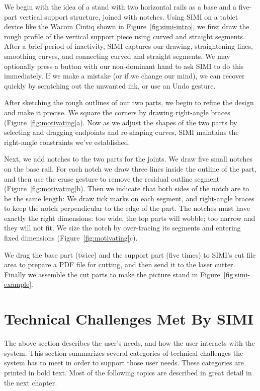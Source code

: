 We begin with the idea of a stand with two horizontal rails as a base
and a five-part vertical support structure, joined with notches. Using
SIMI on a tablet device like the Wacom Cintiq shown in
Figure~\ref{fig:simi-intro}, we first draw the rough profile of the
vertical support piece using curved and straight segments. After a
brief period of inactivity, SIMI captures our drawing, straightening
lines, smoothing curves, and connecting curved and straight
segments. We may optionally press a button with our non-dominant hand
to ask SIMI to do this immediately. If we make a mistake (or if we
change our mind), we can recover quickly by scratching out the
unwanted ink, or use an Undo gesture.

After sketching the rough outlines of our two parts, we begin to
refine the design and make it precise.  We square the corners by
drawing right-angle braces (Figure~\ref{fig:motivating}a).  Now as we
adjust the shapes of the two parts by selecting and dragging endpoints
and re-shaping curves, SIMI maintains the right-angle constraints
we've established.
 
Next, we add notches to the two parts for the joints. We draw five
small notches on the base rail. For each notch we draw three lines
inside the outline of the part, and then use the erase gesture to
remove the residual outline segment (Figure~\ref{fig:motivating}b).
Then we indicate that both sides of the notch are to be the same
length: We draw tick marks on each segment, and right-angle braces to
keep the notch perpendicular to the edge of the part. The notches must
have exactly the right dimensions: too wide, the top parts will
wobble; too narrow and they will not fit. We size the notch by
over-tracing its segments and entering fixed dimensions
(Figure~\ref{fig:motivating}c).
 
We drag the base part (twice) and the support part (five times) to
SIMI's cut file area to prepare a PDF file for cutting, and then send
it to the laser cutter.  Finally we assemble the cut parts to make the
picture stand in Figure~\ref{fig:simi-example}.



\section{Technical Challenges Met By SIMI}

The above section describes the user's needs, and how the user
interacts with the system. This section summarizes several categories
of technical challenges the system has to meet in order to support
those user needs. These categories are printed in bold text. Most of
the following topics are described in great detail in the next
chapter.

